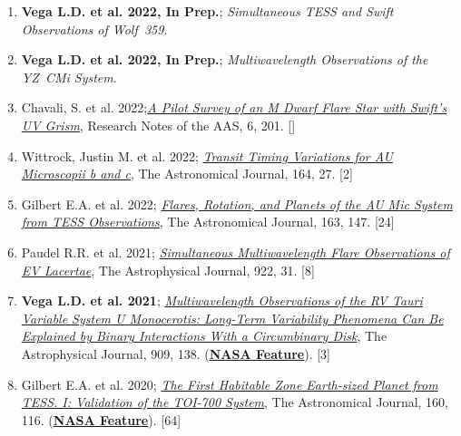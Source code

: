 \documentclass[letter,11pt]{article}
\begin{document}
\begin{enumerate}[\bfseries 1.] 

\item {\bf Vega L.D. et al. 2022, In Prep.}; {\it Simultaneous TESS and Swift Observations of Wolf~359}.

\item {\bf Vega L.D. et al. 2022, In Prep.}; {\it Multiwavelength Observations of the YZ~CMi System}.

\item {Chavali, S. et al. 2022};\href{https://ui.adsabs.harvard.edu/abs/2022RNAAS...6..201C/abstract}{\it A Pilot Survey of an M Dwarf Flare Star with Swift’s UV Grism}, Research Notes of the AAS, 6, 201. []

\item {Wittrock, Justin M. et al. 2022}; \href{https://ui.adsabs.harvard.edu/abs/2022AJ....164...27W/abstract}{\it Transit Timing Variations for AU Microscopii b and c}, The Astronomical Journal, 164, 27. [2]

\item Gilbert E.A. et al. 2022; \href{https://ui.adsabs.harvard.edu/abs/2022AJ....163..147G/abstract}{\it Flares, Rotation, and Planets of the AU Mic System from TESS Observations}, The Astronomical Journal, 163, 147. [24]

\item {Paudel R.R. et al. 2021}; 
\href{https://ui.adsabs.harvard.edu/abs/2021ApJ...922...31P/abstract}{\it Simultaneous Multiwavelength Flare Observations of EV Lacertae}, The Astrophysical Journal, 922, 31. [8]

\item {\bf Vega L.D. et al. 2021}; \href{https://ui.adsabs.harvard.edu/abs/2021ApJ...909..138V/abstract}{\it Multiwavelength Observations of the RV Tauri Variable System U Monocerotis: Long-Term Variability Phenomena Can Be Explained by Binary Interactions With a Circumbinary Disk}, The Astrophysical Journal, 909, 138. (\href{https://www.nasa.gov/feature/goddard/2021/scientists-sketch-aged-star-system-using-over-a-century-of-observations/}{\bf NASA Feature}). [3]

\item Gilbert E.A. et al. 2020; \href{https://ui.adsabs.harvard.edu/abs/2020AJ....160..116G/abstract}{\it The First Habitable Zone Earth-sized Planet from TESS. I: Validation of the TOI-700 System}, The Astronomical Journal, 160, 116.
(\href{https://www.nasa.gov/feature/goddard/2020/nasa-planet-hunter-finds-its-1st-earth-size-habitable-zone-world}{\bf NASA Feature}). [64]


\end{enumerate}
\end{document}
